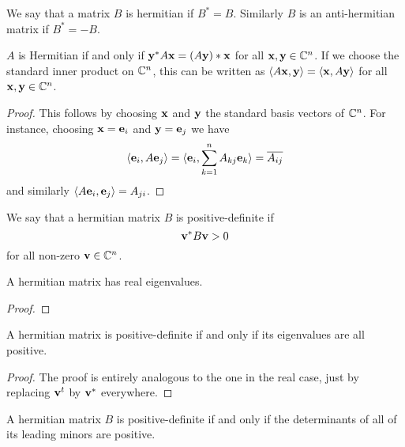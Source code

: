 \documentclass[10pt, a4paper]{article}
\begin{document}
\begin{definition}
    We say that a matrix $B$ is hermitian if $B ^ {*} = B$.
    Similarly $B$ is an anti-hermitian matrix if $B ^ {*} = -B$.
\end{definition}

\begin{proposition}
    $A$ is Hermitian if and only if $\mathbf{y} ^ {*}A\mathbf{x} = (A\mathbf{y}) * \mathbf{x}$ for all $\mathbf{x}, \mathbf{y} \in \mathbb{C} ^ n$.
    If we choose the standard inner product on $\mathbb{C} ^ n$,
    this can be written as $\langle A\mathbf{x}, \mathbf{y}\rangle = \langle \mathbf{x}, A\mathbf{y} \rangle$ for all $\mathbf{x}, \mathbf{y} \in \mathbb{C} ^ n$.

    \begin{proof}
        This follows by choosing $\mathbf{x}$ and $\mathbf{y}$ the standard basis vectors of $\mathbb{C} ^ n$.
        For instance,
        choosing $\mathbf{x} = \mathbf{e}_i$ and $\mathbf{y} = \mathbf{e}_j$ we have
        \[
        \langle\mathbf{e}_i, A\mathbf{e}_j\rangle = \langle \mathbf{e}_i, \sum_{k = 1}^{n}A_{kj}\mathbf{e}_k\rangle = \overline{A_{ij}}
        \]
        and similarly $\langle A\mathbf{e}_i, \mathbf{e}_j\rangle = A_{ji}$.
    \end{proof}
\end{proposition}

\begin{definition}
    We say that a hermitian matrix $B$ is positive-definite if
    \[
    \mathbf{v} ^ {*}B\mathbf{v} > 0
    \]
    for all non-zero $\mathbf{v} \in \mathbb{C} ^ n$.
\end{definition}

\begin{proposition}
    A hermitian matrix has real eigenvalues.
    
    \begin{proof}
    \end{proof}
\end{proposition}

\begin{proposition}
    A hermitian matrix is positive-definite if and only if its eigenvalues are all positive.

    \begin{proof}
        The proof is entirely analogous to the one in the real case,
        just by replacing $\mathbf{v} ^ t$ by $\mathbf{v} ^ {*}$ everywhere.
    \end{proof}
\end{proposition}

\begin{proposition}
    A hermitian matrix $B$ is positive-definite if and only if the determinants of all of its leading minors are positive.
\end{proposition}
\end{document}
